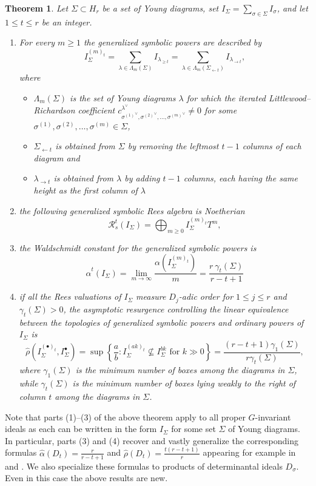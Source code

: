 \documentclass[11pt, reqno]{amsart}
\numberwithin{equation}{section}
\newtheorem*{introthm*}{Theorem}
\theoremstyle{definition}
\renewcommand{\l}{\lambda}
\newcommand{\s}{\sigma}
\begin{document}
\begin{introthm*}
Let $\Sigma\subset H_r$ be a set of Young diagrams, set $I_\Sigma=\sum_{\s\in\Sigma}I_\s$, and let $1\leq t \leq r$ be an  integer.
\begin{enumerate}
\item For every $m\geq 1$ the generalized symbolic powers are described by
\[
I_\Sigma^{(m)_t}=\sum_{\l\in\Lambda_m(\Sigma)} I_{\l_{\geq t}} = \sum_{\lambda\in\Lambda_m(\Sigma_{\leftarrow t})} I_{\lambda_{\rightarrow t}},
\] where
\begin{itemize}
\item $\Lambda_m(\Sigma)$ is the set of Young diagrams $\l$ for which the iterated Littlewood--Richardson coefficient
$c_{{\s^{(1)}}^\vee,{\s^{(2)}}^\vee,\ldots, {\s^{(m)}}^\vee}^{\l^\vee}\neq 0$ for some $\s^{(1)},\s^{(2)},\ldots, \s^{(m)}\in \Sigma$,
\item $\Sigma_{\leftarrow t}$ is obtained from $\Sigma$ by removing the leftmost $t-1$ columns of each diagram and
\item $\lambda_{\rightarrow t}$ is obtained from $\l$ by adding $t-1$ columns, each having the same height as the first column of $\l$
\end{itemize}
\item  the following generalized symbolic Rees algebra  is Noetherian
 \[ \mathcal R_s^t(I_\Sigma)=\bigoplus_{m\geq0} I_{\Sigma}^{(m)_t}T^m, \]
\item  the Waldschmidt constant for the generalized symbolic powers is
\[
\widehat{\alpha}^t(I_\Sigma)=\lim_{m\to\infty}\frac{\alpha(I_\Sigma^{(m)_t})}{m}=\frac{r \ \gamma_{t}(\Sigma)}{r-t+1}
\]
\item if all the Rees valuations of $I_\Sigma$ measure $D_j$-adic order for $1\leq j\leq r$ and $\gamma_t(\Sigma)>0$, the asymptotic resurgence controlling the linear equivalence between the topologies of generalized symbolic powers and  ordinary powers  of $I_\Sigma$ is
\[
\widehat{\rho}(I_\Sigma^{(\bullet)_t}, I_\Sigma^\bullet)=\sup\left\{ \frac{a}{b} :  I_\Sigma^{(ak)_t}\not\subseteq I_\Sigma^{bk} \text{ for }k\gg0 \right\}=\frac{(r-t+1)\gamma_1(\Sigma)}{r\gamma_t(\Sigma)},
\]
where $\gamma_1(\Sigma)$ is the minimum number of boxes among the diagrams in $\Sigma$, while $\gamma_t(\Sigma)$ is the minimum number of boxes lying weakly to the right of column $t$ among the diagrams in $\Sigma$.
\end{enumerate}
\end{introthm*}

Note that parts (1)--(3) of the above theorem apply to all proper $G$-invariant ideals as each can be written in the form $I_\Sigma$ for some set $\Sigma$ of Young diagrams. In particular, parts (3) and (4) recover and vastly generalize the corresponding formulas $\widehat{\alpha}(D_t)=\frac{r}{r-t+1}$ and $\widehat{\rho}(D_t)=\frac{t(r-t+1)}{r}$ appearing for example in \cite[Example 3.15]{bdhmrational} and \cite[Theorem 4.1]{KumarMukundan}.
We also specialize these formulas to products of determinantal ideals
$D_\sigma$.  Even in this case the above results are new.
\end{document}
